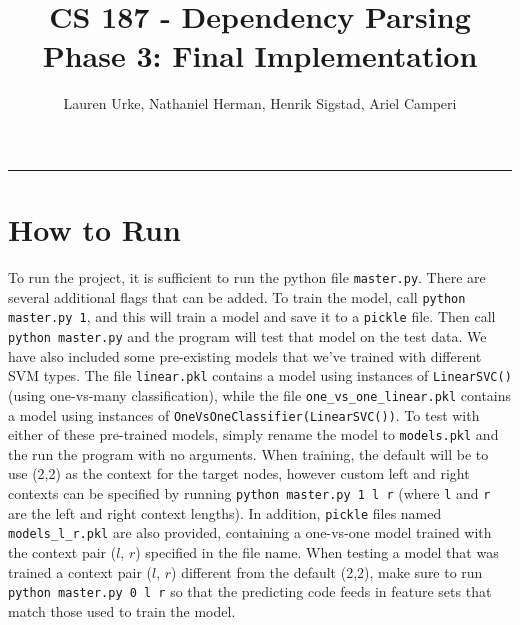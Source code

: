 \documentclass[12pt,fleqn]{article}
\title{CS 187 - Dependency Parsing\\Phase 3: Final Implementation}
\author{Lauren Urke, Nathaniel Herman, Henrik Sigstad, Ariel Camperi}
\date{}
\begin{document}
    \maketitle
    \hrule

    \section*{How to Run}
    To run the project, it is sufficient to run the python file \texttt{master.py}. There are several additional flags that can be added. To train the model, call \texttt{python master.py 1}, and this will train a model and save it to a \texttt{pickle} file. Then call \texttt{python master.py} and the program will test that model on the test data. We have also included some pre-existing models that we've trained with different SVM types. The file \texttt{linear.pkl} contains a model using instances of \texttt{LinearSVC()} (using one-vs-many classification), while the file \texttt{one\_vs\_one\_linear.pkl} contains a model using instances of \texttt{OneVsOneClassifier(LinearSVC())}. To test with either of these pre-trained models, simply rename the model to \texttt{models.pkl} and the run the program with no arguments. When training, the default will be to use (2,2) as the context for the target nodes, however custom left and right contexts can be specified by running \texttt{python master.py 1 l r} (where \texttt{l} and \texttt{r} are the left and right context lengths). In addition, \texttt{pickle} files named \texttt{models\_l\_r.pkl} are also provided, containing a one-vs-one model trained with the context pair ($l$, $r$) specified in the file name. When testing a model that was trained a context pair ($l$, $r$) different from the default (2,2), make sure to run \texttt{python master.py 0 l r} so that the predicting code feeds in feature sets that match those used to train the model.
\end{document}
